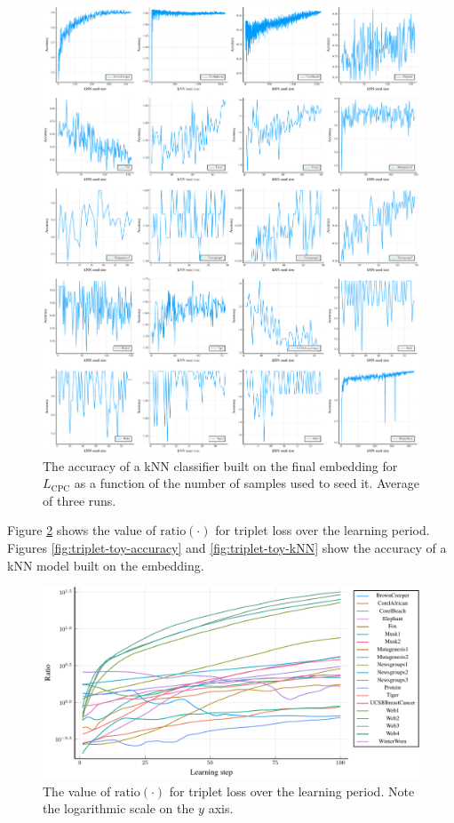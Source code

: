 \begin{figure}[h]
  \centering
  \includegraphics[width=\textwidth]{images/CPC-toy/kNN/CPC-toy-kNN.pdf}
  \caption{The accuracy of a kNN classifier built on the final embedding for \( L_\mathrm{CPC} \) as a function of the number of samples used to seed it. Average of three runs.}\label{fig:CPC-toy-kNN}
\end{figure}

Figure \ref{fig:triplet-toy-ratio} shows the value of \( \mathrm{ratio} \left( \cdot \right) \) for triplet loss over the learning period. Figures \ref{fig:triplet-toy-accuracy} and \ref{fig:triplet-toy-kNN} show the accuracy of a kNN model built on the embedding.

\begin{figure}[h]
  \centering
  \includegraphics[width=\textwidth]{images/triplet-toy/ratio/triplet-toy-ratio.pdf}
  \caption{The value of \( \mathrm{ratio} \left( \cdot \right) \) for triplet loss over the learning period. Note the logarithmic scale on the \( y \) axis.}\label{fig:triplet-toy-ratio}
\end{figure}

